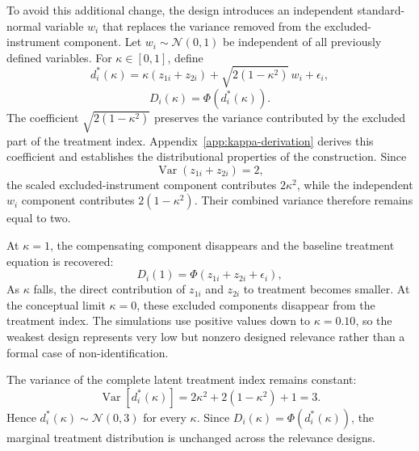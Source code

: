 To avoid this additional change, the design introduces an independent standard-normal variable \(w_i\) that replaces the variance removed from the excluded-instrument component. Let \(w_i\sim \mathcal{N}(0,1)\) be independent of all previously defined variables. For \(\kappa\in[0,1]\), define
\begin{equation}
  d_i^*(\kappa)
  =\kappa(z_{1i}+z_{2i})
  +\sqrt{2(1-\kappa^2)}\,w_i
  +\epsilon_i,
  \label{eq:dgp-kappa-index}
\end{equation}
\begin{equation}
  D_i(\kappa)=\Phi\!\left(d_i^*(\kappa)\right).
  \label{eq:dgp-treatment-kappa}
\end{equation}
The coefficient \(\sqrt{2(1-\kappa^2)}\) preserves the variance contributed by the excluded part of the treatment index. Appendix~\ref{app:kappa-derivation} derives this coefficient and establishes the distributional properties of the construction. Since
\[
\operatorname{Var}(z_{1i}+z_{2i})=2,
\]
the scaled excluded-instrument component contributes \(2\kappa^2\), while the independent \(w_i\) component contributes \(2(1-\kappa^2)\). Their combined variance therefore remains equal to two.

At \(\kappa=1\), the compensating component disappears and the baseline treatment equation is recovered:
\begin{equation}
  D_i(1)=\Phi(z_{1i}+z_{2i}+\epsilon_i),
  \label{eq:dgp-kappa-baseline}
\end{equation}
As \(\kappa\) falls, the direct contribution of \(z_{1i}\) and \(z_{2i}\) to treatment becomes smaller. At the conceptual limit \(\kappa=0\), these excluded components disappear from the treatment index. The simulations use positive values down to \(\kappa=0.10\), so the weakest design represents very low but nonzero designed relevance rather than a formal case of non-identification.

The variance of the complete latent treatment index remains constant:
\begin{equation}
  \operatorname{Var}\!\left[d_i^*(\kappa)\right]
  =2\kappa^2+2(1-\kappa^2)+1=3.
  \label{eq:dgp-kappa-variance}
\end{equation}
Hence \(d_i^*(\kappa)\sim \mathcal{N}(0,3)\) for every \(\kappa\). Since
\(D_i(\kappa)=\Phi(d_i^*(\kappa))\), the marginal treatment distribution is unchanged across the relevance designs.

